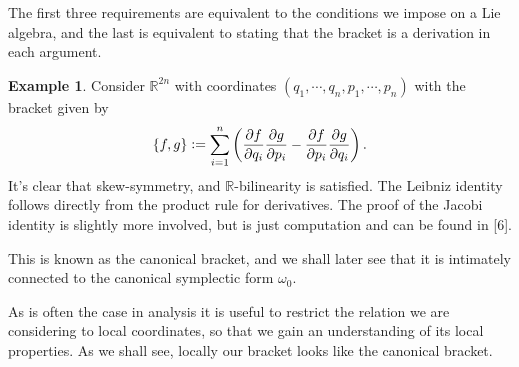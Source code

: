 \documentclass[psamsfonts,12pt]{amsart}
\newcommand\0{\mathbf{0}}
\newcommand{\defeq}{\vcentcolon=}
\theoremstyle{plain}
\theoremstyle{definition}
\newtheorem{ex}[thm]{Example} %
\newcommand{\bbR}{\mathbb{R}}
\begin{document}
The first three requirements are equivalent to the conditions we impose on a Lie algebra, and the last is equivalent to stating that the bracket is a derivation in each argument.

\begin{ex}
Consider $\bbR^{2n}$ with coordinates $(q_1,\cdots,q_n,p_1,\cdots,p_n)$ with the bracket given by
\[
\{f,g\}\defeq \sum_{i=1}^{n}\left(\frac{\partial f}{\partial q_i}\frac{\partial g}{\partial p_i}-\frac{\partial f}{\partial p_i}\frac{\partial g}{\partial q_i}\right).
\]
It's clear that skew-symmetry, and $\bbR$-bilinearity is satisfied.  The Leibniz identity follows directly from the product rule for derivatives.  The proof of the Jacobi identity is slightly more involved, but is just computation and can be found in [6].

This is known as the canonical bracket, and we shall later see that it is intimately connected to the canonical symplectic form $\omega_0$.
\end{ex}

As is often the case in analysis it is useful to restrict the relation we are considering to local coordinates, so that we gain an understanding of its local properties.  As we shall see, locally our bracket looks like the canonical bracket.
\end{document}
